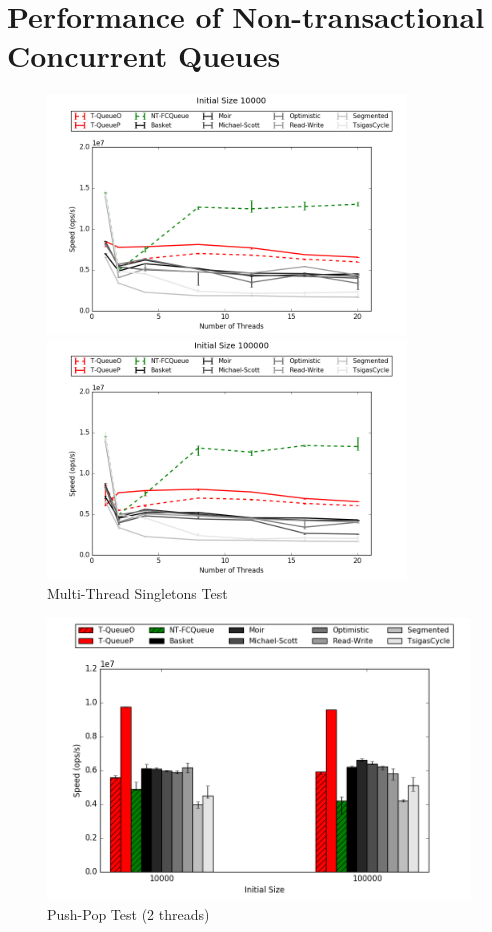 \section{Performance of Non-transactional Concurrent Queues}


\begin{figure}[H]
    \centering
    \includegraphics[width=0.85\textwidth]{concurrent/allQ:RandSingleOps10000.png}
    
    \vspace{12pt}
    \includegraphics[width=0.85\textwidth]{concurrent/allQ:RandSingleOps100000.png}
    \caption*{Multi-Thread Singletons Test}
\end{figure}
\begin{figure}[H]
    \centering
    \includegraphics[width=\textwidth]{concurrent/allQ:PushPop.png}
    \caption*{Push-Pop Test (2 threads)}
\end{figure}

